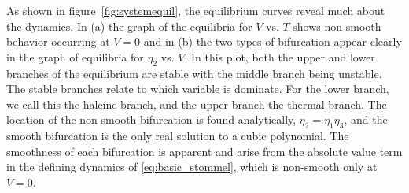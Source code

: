 As shown in figure~\ref{fig:systemequil}, the equilibrium curves reveal much about the dynamics. In (a) the graph of the equilibria for $V$ vs. $T$ shows non-smooth behavior occurring at $V=0$ and in (b) the two types of bifurcation appear clearly in the graph of equilibria for $\eta_2$ vs. $V$. In this plot, both the upper and lower branches of the equilibrium are stable with the middle branch being unstable. The stable branches relate to which variable is dominate. For the lower branch, we call this the halcine branch, and the upper branch the thermal branch. The location of the non-smooth bifurcation is found analytically, $\eta_2=\eta_1\eta_3$, and the smooth bifurcation is the only real solution to a cubic polynomial. The smoothness of each bifurcation is apparent and arise from the absolute value term in the defining dynamics of \eqref{eq:basic_stommel}, which is non-smooth only at $V=0$.

